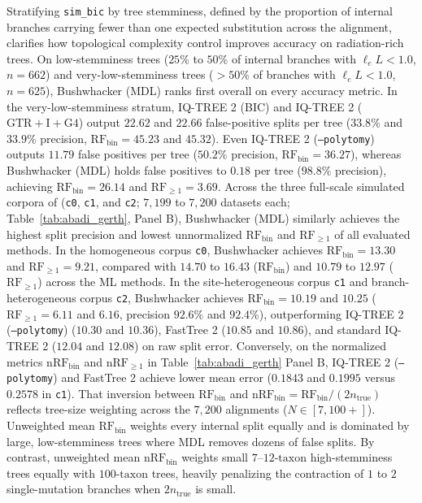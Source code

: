 \documentclass[11pt,a4paper]{article}
\begin{document}
Stratifying \texttt{sim\_bic} by tree stemminess, defined by the proportion of internal branches carrying fewer than one expected substitution across the alignment, clarifies how topological complexity control improves accuracy on radiation-rich trees. On low-stemminess trees ($25\%$ to $50\%$ of internal branches with $\ell_e L < 1.0$, $n = 662$) and very-low-stemminess trees ($>50\%$ of branches with $\ell_e L < 1.0$, $n = 625$), Bushwhacker (MDL) ranks first overall on every accuracy metric. In the very-low-stemminess stratum, IQ-TREE 2 (BIC) and IQ-TREE 2 ($\text{GTR}+\text{I}+\text{G4}$) output $22.62$ and $22.66$ false-positive splits per tree ($33.8\%$ and $33.9\%$ precision, $\text{RF}_{\text{bin}} = 45.23$ and $45.32$). Even IQ-TREE 2 (\texttt{--polytomy}) outputs $11.79$ false positives per tree ($50.2\%$ precision, $\text{RF}_{\text{bin}} = 36.27$), whereas Bushwhacker (MDL) holds false positives to $0.18$ per tree ($98.8\%$ precision), achieving $\text{RF}_{\text{bin}} = 26.14$ and $\text{RF}_{\ge 1} = 3.69$. Across the three full-scale simulated corpora of \citet{abadi2019model} (\texttt{c0}, \texttt{c1}, and \texttt{c2}; $7,199$ to $7,200$ datasets each; Table~\ref{tab:abadi_gerth}, Panel B), Bushwhacker (MDL) similarly achieves the highest split precision and lowest unnormalized $\text{RF}_{\text{bin}}$ and $\text{RF}_{\ge 1}$ of all evaluated methods. In the homogeneous corpus \texttt{c0}, Bushwhacker achieves $\text{RF}_{\text{bin}} = 13.30$ and $\text{RF}_{\ge 1} = 9.21$, compared with $14.70$ to $16.43$ ($\text{RF}_{\text{bin}}$) and $10.79$ to $12.97$ ($\text{RF}_{\ge 1}$) across the ML methods. In the site-heterogeneous corpus \texttt{c1} and branch-heterogeneous corpus \texttt{c2}, Bushwhacker achieves $\text{RF}_{\text{bin}} = 10.19$ and $10.25$ ($\text{RF}_{\ge 1} = 6.11$ and $6.16$, precision $92.6\%$ and $92.4\%$), outperforming IQ-TREE 2 (\texttt{--polytomy}) ($10.30$ and $10.36$), FastTree 2 ($10.85$ and $10.86$), and standard IQ-TREE 2 ($12.04$ and $12.08$) on raw split error. Conversely, on the normalized metrics $\text{nRF}_{\text{bin}}$ and $\text{nRF}_{\ge 1}$ in Table~\ref{tab:abadi_gerth} Panel B, IQ-TREE 2 (\texttt{--polytomy}) and FastTree 2 achieve lower mean error ($0.1843$ and $0.1995$ versus $0.2578$ in \texttt{c1}). That inversion between $\text{RF}_{\text{bin}}$ and $\text{nRF}_{\text{bin}} = \text{RF}_{\text{bin}} / (2 n_{\text{true}})$ reflects tree-size weighting across the $7,200$ alignments ($N \in [7, 100+]$). Unweighted mean $\text{RF}_{\text{bin}}$ weights every internal split equally and is dominated by large, low-stemminess trees where MDL removes dozens of false splits. By contrast, unweighted mean $\text{nRF}_{\text{bin}}$ weights small $7\text{--}12\text{-taxon}$ high-stemminess trees equally with $100\text{-taxon}$ trees, heavily penalizing the contraction of $1$ to $2$ single-mutation branches when $2 n_{\text{true}}$ is small.
\end{document}
